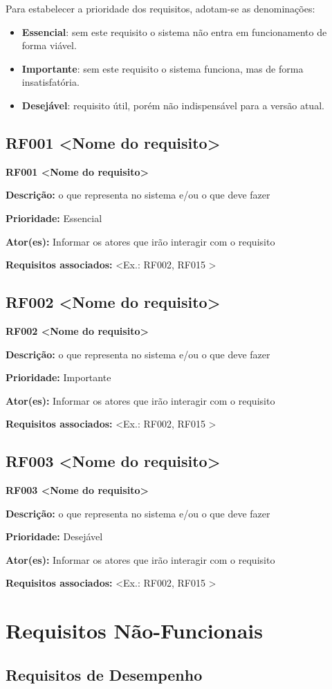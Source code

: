 \documentclass[12pt,a4paper]{article}
\newcommand{\blocoRF}[5]{
\noindent\textbf{#1 \textless #2\textgreater}

\vspace{0.2cm}
\noindent\textbf{Descrição:} #3

\noindent\textbf{Prioridade:} #4

\noindent\textbf{Ator(es):} #5

\noindent\textbf{Requisitos associados:} \textless Ex.: RF002, RF015 \textgreater

\vspace{0.4cm}
}
\begin{document}
Para estabelecer a prioridade dos requisitos, adotam-se as denominações:

\begin{itemize}[leftmargin=1.2cm]
    \item \textbf{Essencial}: sem este requisito o sistema não entra em funcionamento de forma viável.
    \item \textbf{Importante}: sem este requisito o sistema funciona, mas de forma insatisfatória.
    \item \textbf{Desejável}: requisito útil, porém não indispensável para a versão atual.
\end{itemize}

\subsection{RF001 \textless Nome do requisito\textgreater}

\blocoRF
{RF001}
{Nome do requisito}
{o que representa no sistema e/ou o que deve fazer}
{Essencial}
{Informar os atores que irão interagir com o requisito}

\subsection{RF002 \textless Nome do requisito\textgreater}

\blocoRF
{RF002}
{Nome do requisito}
{o que representa no sistema e/ou o que deve fazer}
{Importante}
{Informar os atores que irão interagir com o requisito}

\subsection{RF003 \textless Nome do requisito\textgreater}

\blocoRF
{RF003}
{Nome do requisito}
{o que representa no sistema e/ou o que deve fazer}
{Desejável}
{Informar os atores que irão interagir com o requisito}

\section{Requisitos Não-Funcionais}

\subsection{Requisitos de Desempenho}
\end{document}
